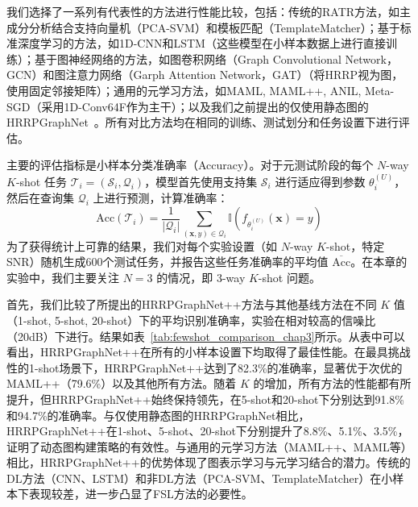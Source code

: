 我们选择了一系列有代表性的方法进行性能比较，包括：传统的RATR方法，如主成分分析结合支持向量机（PCA-SVM）和模板匹配（TemplateMatcher）；基于标准深度学习的方法，如1D-CNN和LSTM（这些模型在小样本数据上进行直接训练）；基于图神经网络的方法，如图卷积网络（Graph Convolutional Network，GCN）和图注意力网络（Garph Attention Network，GAT）（将HRRP视为图，使用固定邻接矩阵）；通用的元学习方法，如MAML, MAML++, ANIL, Meta-SGD（采用1D-Conv64F作为主干）；以及我们之前提出的仅使用静态图的HRRPGraphNet~\cite{chen_hrrpgraphnet_2024}。所有对比方法均在相同的训练、测试划分和任务设置下进行评估。

主要的评估指标是小样本分类准确率（Accuracy）。对于元测试阶段的每个 $N$-way $K$-shot 任务 $\mathcal{T}_i = (\mathcal{S}_i, \mathcal{Q}_i)$，模型首先使用支持集 $\mathcal{S}_i$ 进行适应得到参数 $\theta_i^{(U)}$，然后在查询集 $\mathcal{Q}_i$ 上进行预测，计算准确率：
\begin{equation}
    \text{Acc}(\mathcal{T}_i) = \frac{1}{|\mathcal{Q}_i|} \sum_{(\mathbf{x},y) \in \mathcal{Q}_i} \mathbb{I}(f_{\theta_i^{(U)}}(\mathbf{x}) = y)
    \label{eq:accuracy_metric}
\end{equation}
为了获得统计上可靠的结果，我们对每个实验设置（如 $N$-way $K$-shot，特定SNR）随机生成600个测试任务，并报告这些任务准确率的平均值 $\overline{\text{Acc}}$。在本章的实验中，我们主要关注 $N=3$ 的情况，即 3-way $K$-shot 问题。

首先，我们比较了所提出的HRRPGraphNet++方法与其他基线方法在不同 $K$ 值（1-shot, 5-shot, 20-shot）下的平均识别准确率，实验在相对较高的信噪比（20dB）下进行。结果如表~\ref{tab:fewshot_comparison_chap3}所示。从表中可以看出，HRRPGraphNet++在所有的小样本设置下均取得了最佳性能。在最具挑战性的1-shot场景下，HRRPGraphNet++达到了82.3\%的准确率，显著优于次优的MAML++（79.6\%）以及其他所有方法。随着 $K$ 的增加，所有方法的性能都有所提升，但HRRPGraphNet++始终保持领先，在5-shot和20-shot下分别达到91.8\%和94.7\%的准确率。与仅使用静态图的HRRPGraphNet相比，HRRPGraphNet++在1-shot、5-shot、20-shot下分别提升了8.8\%、5.1\%、3.5\%，证明了动态图构建策略的有效性。与通用的元学习方法（MAML++、MAML等）相比，HRRPGraphNet++的优势体现了图表示学习与元学习结合的潜力。传统的DL方法（CNN、LSTM）和非DL方法（PCA-SVM、TemplateMatcher）在小样本下表现较差，进一步凸显了FSL方法的必要性。

